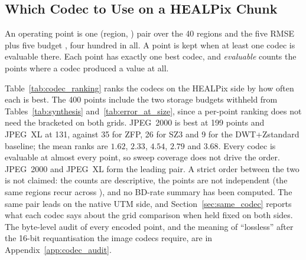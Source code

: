 \subsection{Which Codec to Use on a HEALPix Chunk}
\label{sec:codec_choice}

An operating point is one (region, ) pair over the 40 regions and
the five RMSE plus five budget , four hundred in all. A point is
kept when at least one codec is evaluable there. Each point has exactly
one best codec, and \emph{evaluable} counts the points where a codec
produced a value at all.



Table~\ref{tab:codec_ranking} ranks the codecs on the HEALPix side by
how often each is best. The 400 points include the two storage budgets
withheld from Tables~\ref{tab:synthesis} and~\ref{tab:error_at_size},
since a per-point ranking does not need the  bracketed on both
grids. JPEG~2000 is best at 199 points and JPEG~XL
at 131, against 35 for ZFP, 26 for SZ3 and 9 for the DWT+Zstandard
baseline; the mean ranks are $1.62$, $2.33$, $4.54$, $2.79$ and $3.68$.
Every codec is evaluable at almost every point, so sweep coverage does not
drive the order. JPEG~2000 and JPEG~XL form the leading pair. A strict
order between the two is not claimed: the counts are descriptive, the
points are not independent (the same regions recur across ), and
no BD-rate summary has been computed. The same pair
leads on the native UTM side, and Section~\ref{sec:same_codec} reports
what each codec says about the grid comparison when held fixed on both
sides. The byte-level audit of every encoded point, and the meaning of
``lossless'' after the 16-bit requantisation the image codecs require,
are in Appendix~\ref{app:codec_audit}.
